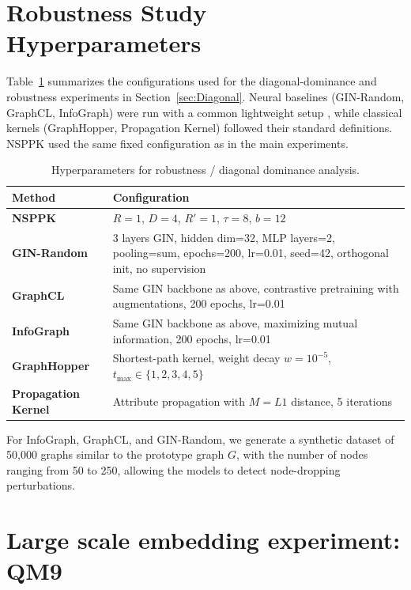 \section{Robustness Study Hyperparameters}
\label{appendix:robustness}

Table~\ref{tab:robustness-hparams} summarizes the configurations used for the
diagonal-dominance and robustness experiments in
Section~\ref{sec:Diagonal}.
Neural baselines (GIN-Random, GraphCL, InfoGraph) were run with a common lightweight setup , while classical kernels (GraphHopper, Propagation Kernel) followed their standard definitions. NSPPK used the same fixed configuration as in the main experiments.

\begin{table}[H]
\centering
\caption{Hyperparameters for robustness / diagonal dominance analysis.}
\label{tab:robustness-hparams}
\renewcommand{\arraystretch}{1.1}
\setlength{\tabcolsep}{6pt}
\begin{tabular}{p{3.2cm} p{9.5cm}}
\toprule
\textbf{Method} & \textbf{Configuration} \\
\midrule
\textbf{NSPPK} & $R=1$, $D=4$, $R'=1$, $\tau=8$, $b=12$ \\
\textbf{GIN-Random} & 3 layers GIN, hidden dim=32, MLP layers=2, pooling=sum, epochs=200, lr=0.01, seed=42, orthogonal init, no supervision \\
\textbf{GraphCL} & Same GIN backbone as above, contrastive pretraining with augmentations, 200 epochs, lr=0.01 \\
\textbf{InfoGraph} & Same GIN backbone as above, maximizing mutual information, 200 epochs, lr=0.01 \\
\textbf{GraphHopper} & Shortest-path kernel, weight decay $w=10^{-5}$, $t_{\max} \in \{1,2,3,4,5\}$ \\
\textbf{Propagation Kernel} & Attribute propagation with $M=L1$ distance, 5 iterations \\
\bottomrule
\end{tabular}
\end{table}



For InfoGraph, GraphCL, and GIN-Random, we generate a synthetic dataset of
50{,}000 graphs similar to the prototype graph $G$, with the number of nodes
ranging from 50 to 250, allowing the models to detect node-dropping
perturbations.

\section{Large scale embedding experiment: QM9}
\label{appendix:qm9}

